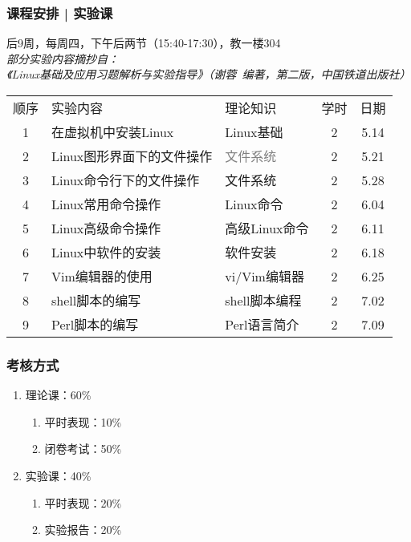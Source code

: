 \begin{frame}
  \frametitle{课程安排 | 实验课}
  \begin{center}
  \alert{后9周，每周四，下午后两节（15:40-17:30），教一楼304}\\
  \vspace{0.2cm}
  {\footnotesize
  \textit{部分实验内容摘抄自：\\ 《Linux基础及应用习题解析与实验指导》（谢蓉\ 编著，第二版，中国铁道出版社）}
  }
  \end{center}
  \vspace{-0.5cm}
  \begin{table}
    \centering
    \begin{tabular}{cllcc}
      \hline
      \rowcolor{blue!50}顺序 & 实验内容 & 理论知识 & 学时 & 日期\\
      1 & 在虚拟机中安装Linux & Linux基础 & 2 & 5.14\\
      2 & Linux图形界面下的文件操作 & \textcolor{gray}{文件系统} & 2 & 5.21\\
      3 & Linux命令行下的文件操作 & 文件系统 & 2 & 5.28\\
      4 & Linux常用命令操作 & Linux命令 & 2 & 6.04\\
      5 & Linux高级命令操作 & 高级Linux命令 & 2 & 6.11\\
      6 & Linux中软件的安装 & 软件安装 & 2 & 6.18\\
      7 & Vim编辑器的使用 & vi/Vim编辑器 & 2 & 6.25\\
      8 & shell脚本的编写 & shell脚本编程 & 2 & 7.02\\
      9 & Perl脚本的编写 & Perl语言简介 & 2 & 7.09\\
      \hline
    \end{tabular}
  \end{table}
\end{frame}

\begin{frame}
  \frametitle{考核方式}
  \begin{enumerate}
    \item 理论课：60\%
      \begin{enumerate}
        \item 平时表现：10\%
        \item 闭卷考试：50\%
      \end{enumerate}
    \item 实验课：40\%
      \begin{enumerate}
        \item 平时表现：20\%
        \item 实验报告：20\%
      \end{enumerate}
  \end{enumerate}
\end{frame}

